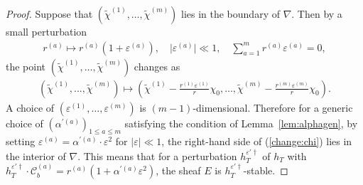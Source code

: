 \documentclass[11pt,oneside,a4paper,mathscr]{amsart}
\theoremstyle{definition}
\renewcommand{\leq}{\leqslant}
\newcommand{\cC}{\mathcal{C}}
\begin{document}
\begin{proof}
Suppose that $(\widetilde{\chi}^{(1)}, \ldots, \widetilde{\chi}^{(m)})$ lies in the boundary of $\nabla$. Then by a small perturbation 
\begin{align*}
r^{(a)} \mapsto r^{(a)}(1+\varepsilon^{(a)}), \quad
\lvert \varepsilon^{(a)} \rvert \ll 1, \quad
\sum_{a=1}^m r^{(a)}\varepsilon^{(a)}=0,
\end{align*}
the point $(\widetilde{\chi}^{(1)}, \ldots, \widetilde{\chi}^{(m)})$ changes as  
\begin{align}\label{change:chi}
 (\widetilde{\chi}^{(1)}, \ldots, \widetilde{\chi}^{(m)}) \mapsto   
 \left(\widetilde{\chi}^{(1)}-\frac{r^{(1)} \varepsilon^{(1)}}{r}\chi_0, \ldots,
 \widetilde{\chi}^{(m)}-\frac{r^{(m)} \varepsilon^{(m)}}{r}\chi_0\right).
\end{align}
A choice of $(\varepsilon^{(1)}, \ldots, \varepsilon^{(m)})$ is $(m-1)$-dimensional.
Therefore for a generic choice of $(\alpha^{'(a)})_{1\leq a\leq m}$ 
satisfying the condition of Lemma~\ref{lem:alphagen}, by setting
$\varepsilon^{(a)}=\alpha^{'(a)} \cdot \varepsilon^2$ for $\lvert \varepsilon \rvert \ll 1$, 
the right-hand side of (\ref{change:chi}) 
lies in the interior of $\nabla$.
This means that for a perturbation $h_T^{\varepsilon'\dag}$ of $h_T$ 
with $h_T^{\varepsilon'\dag} \cdot \cC_b^{(a)}=r^{(a)}(1+\alpha^{'(a)}\varepsilon^2)$, the sheaf $E$ is $h_T^{\varepsilon'\dag}$-stable.
\end{proof}
\end{document}

